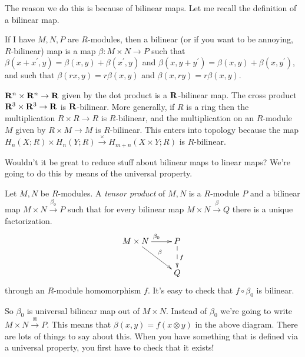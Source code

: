 The reason we do this is because of bilinear maps. Let me recall the definition of a bilinear map.
\begin{definition}
If I have $M,N,P$ are $R$-modules, then a bilinear (or if you want to be annoying, $R$-bilinear) map is a map $\beta:M\times N\to P$ such that $\beta(x+x^\prime,y)=\beta(x,y)+\beta(x^\prime,y)$ and $\beta(x,y+y^\prime)=\beta(x,y)+\beta(x,y^\prime)$, and such that $\beta(rx,y)=r\beta(x,y)$ and $\beta(x,ry)=r\beta(x,y)$.
\end{definition}
\begin{example}
$\mathbf R^n\times\mathbf R^n\to\mathbf R$ given by the dot product is a $\mathbf R$-bilinear map. The cross product $\mathbf R^3\times\mathbf R^3\to\mathbf R$ is $\mathbf R$-bilinear. More generally, if $R$ is a ring then the multiplication $R\times R\to R$ is $R$-bilinear, and the multiplication on an $R$-module $M$ given by $R\times M\to M$ is $R$-bilinear. This enters into topology because the map $ H_n(X;R)\times H_n(Y;R)\xrightarrow{\times} H_{m+n}(X\times Y;R)$ is $R$-bilinear.
\end{example}
Wouldn't it be great to reduce stuff about bilinear maps to linear maps? We're going to do this by means of the universal property.
\begin{definition}
Let $M,N$ be $R$-modules. A \emph{tensor product} of $M,N$ is a $R$-module $P$ and a bilinear map $M\times N\xrightarrow{\beta_0}P$ such that for every bilinear map $M\times N\xrightarrow{\beta}Q$ there is a unique factorization.
\begin{equation*}
\xymatrix{M\times N\ar[r]^{\beta_0}\ar[dr]^\beta & P\ar@{-->}[d]^f\\
 & Q}
\end{equation*}
through an $R$-module homomorphism $f$. It's easy to check that $f\circ\beta_0$ is bilinear.
\end{definition}
So $\beta_0$ is universal bilinear map out of $M\times N$. Instead of $\beta_0$ we're going to write $M\times N\xrightarrow{\otimes}P$. This means that $\beta(x,y)=f(x\otimes y)$ in the above diagram. There are lots of things to say about this. When you have something that is defined via a universal property, you first have to check that it exists!
